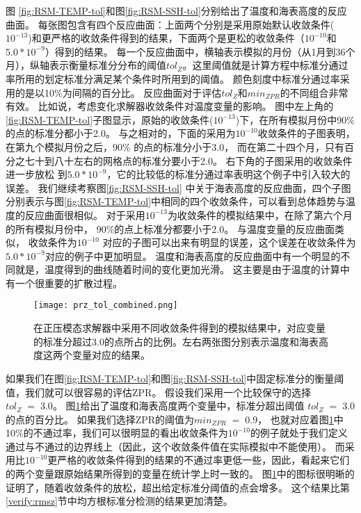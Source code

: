 图 \ref{fig:RSM-TEMP-tol}和图\ref{fig:RSM-SSH-tol}分别给出了温度和海表高度的反应曲面。 
每张图包含有四个反应曲面：上面两个分别是采用原始默认收敛条件($10^{-13}$)和更严格的收敛条件得到的结果，下面两个是更松的收敛条件（$10^{-10}$和$5.0*10^{-9}$）得到的结果。 
每一个反应曲面中，横轴表示模拟的月份（从1月到36个月），纵轴表示衡量标准分分布的阈值$tol_{Z}$。这里阈值就是计算方程中标准分通过率所用的划定标准分满足某个条件时所用到的阈值。
颜色刻度中标准分通过率采用的是以10\%为间隔的百分比。 
反应曲面对于评估$tol_{Z}$和$min_{ZPR}$的不同组合非常有效。
比如说，考虑变化求解器收敛条件对温度变量的影响。 
图中左上角的\ref{fig:RSM-TEMP-tol}子图显示，原始的收敛条件($10^{-13}$)下，在所有模拟月份中90\% 的点的标准分都小于2.0。
与之相对的，下面的采用为$10^{-10}$收敛条件的子图表明，在第九个模拟月份之后，90\% 的点的标准分小于3.0， 而在第二十四个月，只有百分之七十到八十左右的网格点的标准分要小于2.0。
右下角的子图采用的收敛条件进一步放松 到$5.0*10^{-9}$，它的比较低的标准分通过率表明这个例子中引入较大的误差。
我们继续考察图\ref{fig:RSM-SSH-tol} 中关于海表高度的反应曲面，四个子图分别表示与图\ref{fig:RSM-TEMP-tol}中相同的四个收敛条件，可以看到总体趋势与温度的反应曲面很相似。 
对于采用$10^{-13}$为收敛条件的模拟结果中，在除了第六个月的所有模拟月份中， 90\%的点上标准分都要小于2.0。 
与温度变量的反应曲面类似， 收敛条件为$10^{-10}$ 对应的子图可以出来有明显的误差，这个误差在收敛条件为$5.0*10^{-9}$对应的例子中更加明显。 
温度和海表高度的反应曲面中有一个明显的不同就是，温度得到的曲线随着时间的变化更加光滑。 这主要是由于温度的计算中有一个很重要的扩散过程。

 

\begin{figure} 
\centering 
\texttt{[image: prz\_tol\_combined.png]}
\caption { 
  在正压模态求解器中采用不同收敛条件得到的模拟结果中，对应变量的标准分超过3.0的点所占的比例。左右两张图分别表示温度和海表高度这两个变量对应的结果。}
\label {fig:PRZ-tol}
\end{figure}

如果我们在图\ref{fig:RSM-TEMP-tol}和图\ref{fig:RSM-SSH-tol}中固定标准分的衡量阈值，我们就可以很容易的评估ZPR。 
假设我们采用一个比较保守的选择$tol_{Z} \; = \; 3.0$。 
图\ref{fig:PRZ-tol}给出了温度和海表高度两个变量中，标准分超出阈值 $tol_{Z} \; = \; 3.0$ 的点的百分比。 
如果我们选择ZPR的阈值为$min_{ZPR} \; = \; 0.9$， 也就对应着图\ref{fig:PRZ-tol}中10\%的不通过率，我们可以很明显的看出收敛条件为$10^{-10}$的例子就处于我们定义通过与不通过的边界线上（因此，这个收敛条件值在实际模拟中不能使用）。 
而采用比$10^{-10}$更严格的收敛条件得到的结果的不通过率更低一些，因此，看起来它们的两个变量跟原始结果所得到的变量在统计学上时一致的。
图\ref{fig:PRZ-tol}中的图标很明晰的证明了，随着收敛条件的放松，超出给定标准分阈值的点会增多。 
这个结果比第\ref{verify:rmsz}节中均方根标准分检测的结果更加清楚。 



